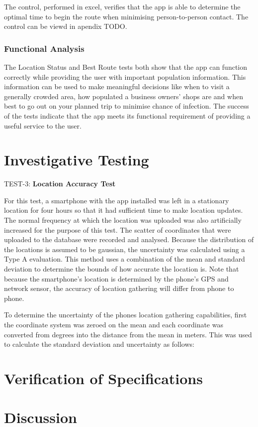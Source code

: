 The control, performed in excel, verifies that the app is able to determine the optimal time to begin the route when minimising person-to-person contact. The control can be viewd in apendix TODO.

\subsubsection{Functional Analysis}

The Location Status and Best Route tests both show that the app can function correctly while providing the user with important population information. This information can be used to make meaningful decisions like when to visit a generally crowded area, how populated a business owners’ shops are and when best to go out on your planned trip to minimise chance of infection. The success of the tests indicate that the app meets its functional requirement of providing a useful service to the user.

\section{Investigative Testing}

TEST-3: \textbf{Location Accuracy Test}

For this test, a smartphone with the app installed was left in a stationary location for four hours so that it had sufficient time to make location updates. The normal frequency at which the location was uploaded was also artificially increased for the purpose of this test. The scatter of coordinates that were uploaded to the database were recorded and analysed. Because the distribution of the locations is assumed to be gaussian, the uncertainty was calculated using a Type A evaluation. This method uses a combination of the mean and standard deviation to determine the bounds of how accurate the location is. Note that because the smartphone’s location is determined by the phone’s GPS and network sensor, the accuracy of location gathering will differ from phone to phone.

To determine the uncertainty of the phones location gathering capabilities, first the coordinate system was zeroed on the mean and each coordinate was converted from degrees into the distance from the mean in meters. This was used to calculate the standard deviation and uncertainty as follows:



\section{Verification of Specifications}



\section{Discussion}